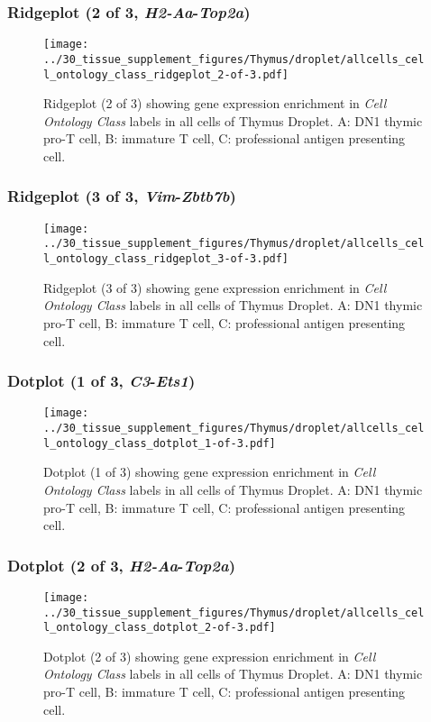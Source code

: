 \clearpage

\subsubsection{Ridgeplot (2 of 3, \emph{H2-Aa}-\emph{Top2a})}
\begin{figure}[h]
\centering
\texttt{[image: ../30\_tissue\_supplement\_figures/Thymus/droplet/allcells\_cell\_ontology\_class\_ridgeplot\_2-of-3.pdf]}

\caption{ Ridgeplot (2 of 3)  showing gene expression enrichment in \emph{Cell Ontology Class} labels in all cells of Thymus Droplet. A: DN1 thymic pro-T cell, B: immature T cell, C: professional antigen presenting cell.}
\end{figure}


\clearpage

\subsubsection{Ridgeplot (3 of 3, \emph{Vim}-\emph{Zbtb7b})}
\begin{figure}[h]
\centering
\texttt{[image: ../30\_tissue\_supplement\_figures/Thymus/droplet/allcells\_cell\_ontology\_class\_ridgeplot\_3-of-3.pdf]}

\caption{ Ridgeplot (3 of 3)  showing gene expression enrichment in \emph{Cell Ontology Class} labels in all cells of Thymus Droplet. A: DN1 thymic pro-T cell, B: immature T cell, C: professional antigen presenting cell.}
\end{figure}


\clearpage

\subsubsection{Dotplot (1 of 3, \emph{C3}-\emph{Ets1})}
\begin{figure}[h]
\centering
\texttt{[image: ../30\_tissue\_supplement\_figures/Thymus/droplet/allcells\_cell\_ontology\_class\_dotplot\_1-of-3.pdf]}

\caption{ Dotplot (1 of 3)  showing gene expression enrichment in \emph{Cell Ontology Class} labels in all cells of Thymus Droplet. A: DN1 thymic pro-T cell, B: immature T cell, C: professional antigen presenting cell.}
\end{figure}


\clearpage

\subsubsection{Dotplot (2 of 3, \emph{H2-Aa}-\emph{Top2a})}
\begin{figure}[h]
\centering
\texttt{[image: ../30\_tissue\_supplement\_figures/Thymus/droplet/allcells\_cell\_ontology\_class\_dotplot\_2-of-3.pdf]}

\caption{ Dotplot (2 of 3)  showing gene expression enrichment in \emph{Cell Ontology Class} labels in all cells of Thymus Droplet. A: DN1 thymic pro-T cell, B: immature T cell, C: professional antigen presenting cell.}
\end{figure}


